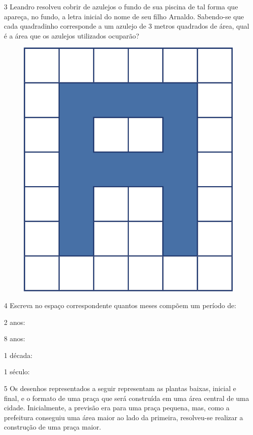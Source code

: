 \pagebreak
\num{3} Leandro resolveu cobrir de azulejos o fundo de sua piscina de tal forma
que apareça, no fundo, a letra inicial do nome de seu filho Arnaldo.
Sabendo-se que cada quadradinho corresponde a um azulejo de 3 metros
quadrados de área, qual é a área que os azulejos utilizados
ocuparão?

\begin{figure}[htpb!]
\centering
\includegraphics[width=.45\textwidth]{media/image29.png}
\end{figure}


\begin{mdframed}[linewidth=2pt,linecolor=salmao,roundcorner=2pt]
\vspace*{1cm}
\end{mdframed}

\num{4} Escreva no espaço correspondente quantos meses compõem um período de:

\begin{escolha}
\item
  2 anos: 

\item
  8 anos: 

\item
  1 década: 

\item
  1 século: 
\end{escolha}

\num{5} Os desenhos representados a seguir representam as plantas baixas, inicial
e final, e o formato de uma praça que será construída em uma área
central de uma cidade. Inicialmente, a previsão era para uma praça
pequena, mas, como a prefeitura conseguiu uma área maior ao lado da
primeira, resolveu-se realizar a construção de uma praça maior.

